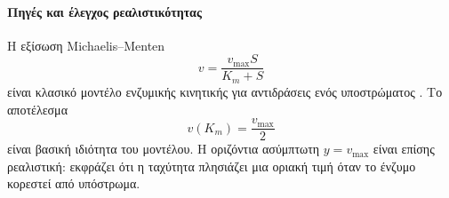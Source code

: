 \paragraph{Πηγές και έλεγχος ρεαλιστικότητας}
Η εξίσωση Michaelis--Menten
\[
  v=\frac{v_{\max}S}{K_m+S}
\]
είναι κλασικό μοντέλο ενζυμικής κινητικής για αντιδράσεις ενός
υποστρώματος \cite{michaelisMentenKinetics}. Το αποτέλεσμα
\[
  v(K_m)=\frac{v_{\max}}{2}
\]
είναι βασική ιδιότητα του μοντέλου. Η οριζόντια ασύμπτωτη
\(y=v_{\max}\) είναι επίσης ρεαλιστική: εκφράζει ότι η ταχύτητα
πλησιάζει μια οριακή τιμή όταν το ένζυμο κορεστεί από υπόστρωμα.
